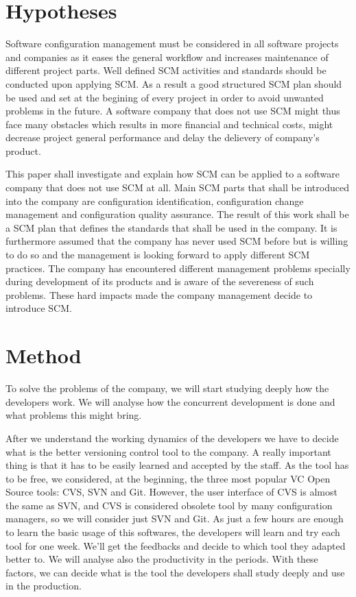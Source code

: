 \documentclass[a4paper]{article}
\begin{document}
\section{Hypotheses}
Software configuration management must be considered in all software projects and companies as it eases the general workflow and increases maintenance of different project parts. Well defined SCM activities and standards should be conducted upon applying SCM. As a result a good structured SCM plan should be used and set at the begining of every project in order to avoid unwanted problems in the future. A software company that does not use SCM might thus face many obstacles which results in more financial and technical costs, might decrease project general performance and delay the delievery of company's product. 

This paper shall investigate and explain how SCM can be applied to a software company that does not use SCM at all. Main SCM parts that shall be introduced into the company are configuration identification, configuration change management and configuration quality assurance. The result of this work shall be a SCM plan that defines the standards that shall be used in the company. It is furthermore assumed that the company has never used SCM before but is willing to do so and the management is looking forward to apply different SCM practices. The company has encountered different management problems specially during development of its products and is aware of the severeness of such problems. These hard impacts made the company management decide to introduce SCM.

\section{Method}
To solve the problems of the company, we will start studying deeply how the developers work. We will analyse how the concurrent development is done and what problems this might bring.

After we understand the working dynamics of the developers we have to decide what is the better versioning control tool to the company. A really important thing is that it has to be easily learned and accepted by the staff. As the tool has to be free, we considered, at the beginning, the three most popular VC Open Source tools: CVS, SVN and Git. However, the user interface of CVS is almost the same as SVN, and CVS is considered obsolete tool by many configuration managers, so we will consider just SVN and Git. As just a few hours are enough to learn the basic usage of this softwares, the developers will learn and try each tool for one week. We'll get the feedbacks and decide to which tool they adapted better to. We will analyse also the productivity in the periods. With these factors, we can decide what is the tool the developers shall study deeply and use in the production.
\end{document}

